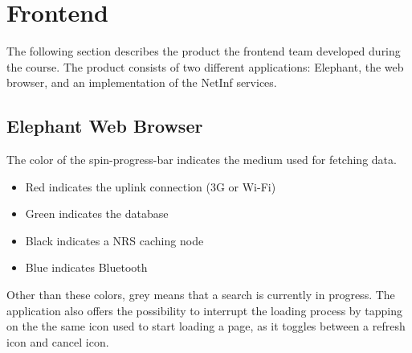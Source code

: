 \section {Frontend}
The following section describes the product the frontend team developed during the course.
The product consists of two different applications: Elephant, the web browser, and an implementation
of the NetInf services.

\subsection{Elephant Web Browser}
\label{sec:Elephant Web Browser}
The color of the spin-progress-bar indicates the medium used for fetching data.  
\begin{itemize}
\item Red indicates the uplink connection (3G or Wi-Fi)
\item Green indicates the database
\item Black indicates a NRS caching node
\item Blue indicates Bluetooth
\end{itemize}
Other than these colors, grey means that a search is currently in progress.
The application also offers the possibility to interrupt the
loading process by tapping on the the same icon used to start loading a page, as it toggles between a refresh
icon and cancel icon. 
